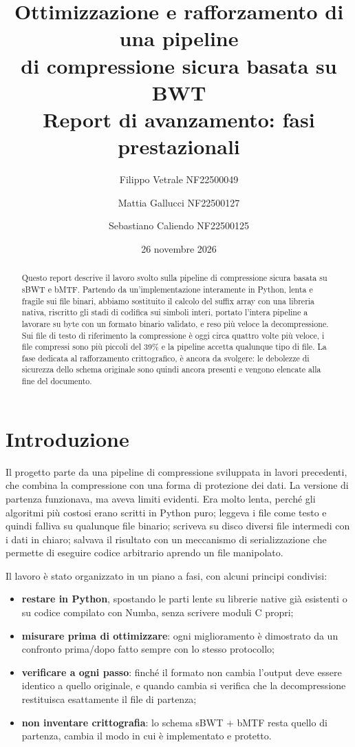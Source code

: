 \documentclass[11pt,a4paper]{article}
\title{Ottimizzazione e rafforzamento di una pipeline\\di compressione sicura basata su BWT\\[0.5em]
\large Report di avanzamento: fasi prestazionali}
\author{Filippo Vetrale NF22500049 \and Mattia Gallucci NF22500127 \and Sebastiano Caliendo NF22500125}
\date{26 novembre 2026}
\begin{document}
\maketitle

\begin{abstract}
Questo report descrive il lavoro svolto sulla pipeline di compressione sicura basata su
sBWT e bMTF. Partendo da un'implementazione interamente in Python, lenta e fragile sui file binari, abbiamo sostituito il calcolo del
suffix array con una libreria nativa, riscritto gli stadi di codifica sui simboli interi,
portato l'intera pipeline a lavorare su byte con un formato binario validato, e reso più
veloce la decompressione. Sui file di testo di riferimento la compressione è oggi circa
quattro volte più veloce, i file compressi sono più piccoli del 39\% e la pipeline accetta
qualunque tipo di file. La fase dedicata al rafforzamento crittografico, è ancora da
svolgere: le debolezze di sicurezza dello schema originale sono quindi ancora presenti e
vengono elencate alla fine del documento.
\end{abstract}

\section{Introduzione}

Il progetto parte da una pipeline di compressione sviluppata in lavori precedenti, che
combina la compressione con una forma di protezione dei dati.
La versione di partenza funzionava, ma aveva limiti evidenti. Era molto lenta, perché gli
algoritmi più costosi erano scritti in Python puro; leggeva i file come testo e quindi
falliva su qualunque file binario; scriveva su disco diversi file intermedi con i dati in
chiaro; salvava il risultato con un meccanismo di serializzazione che permette di eseguire
codice arbitrario aprendo un file manipolato.

Il lavoro è stato organizzato in un piano a fasi, con alcuni principi condivisi:
\begin{itemize}
  \item \textbf{restare in Python}, spostando le parti lente su librerie native già
        esistenti o su codice compilato con Numba, senza scrivere moduli C propri;
  \item \textbf{misurare prima di ottimizzare}: ogni miglioramento è dimostrato da un
        confronto prima/dopo fatto sempre con lo stesso protocollo;
  \item \textbf{verificare a ogni passo}: finché il formato non cambia l'output deve essere
        identico a quello originale, e quando cambia si verifica che la decompressione
        restituisca esattamente il file di partenza;
  \item \textbf{non inventare crittografia}: lo schema sBWT + bMTF resta quello di
        partenza, cambia il modo in cui è implementato e protetto.
\end{itemize}
\end{document}
